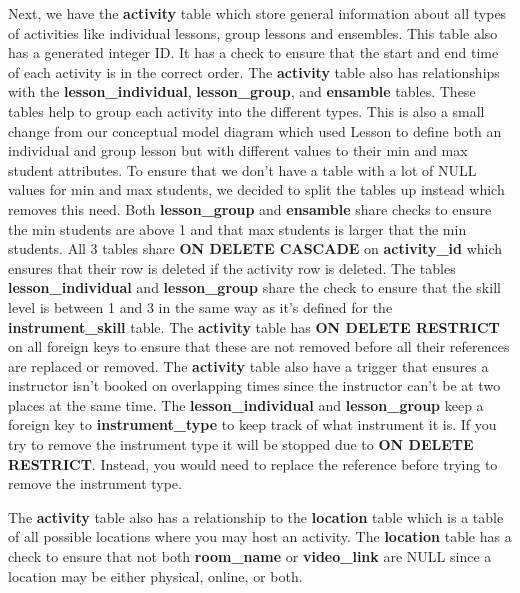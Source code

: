 \documentclass[a4paper]{scrartcl}
\begin{document}
Next, we have the \textbf{activity} table which store general information about all types of activities like individual lessons, group lessons and ensembles. This table also has a generated integer ID. It has a check to ensure that the start and end time of each activity is in the correct order. The \textbf{activity} table also has relationships with the \textbf{lesson\_individual}, \textbf{lesson\_group}, and \textbf{ensamble} tables. These tables help to group each activity into the different types. This is also a small change from our conceptual model diagram which used Lesson to define both an individual and group lesson but with different values to their min and max student attributes. To ensure that we don't have a table with a lot of NULL values for min and max students, we decided to split the tables up instead which removes this need. Both \textbf{lesson\_group} and \textbf{ensamble} share checks to ensure the min students are above 1 and that max students is larger that the min students. All 3 tables share \textbf{ON DELETE CASCADE} on \textbf{activity\_id} which ensures that their row is deleted if the activity row is deleted. The tables \textbf{lesson\_individual} and \textbf{lesson\_group} share the check to ensure that the skill level is between 1 and 3 in the same way as it's defined for the \textbf{instrument\_skill} table. The \textbf{activity} table has \textbf{ON DELETE RESTRICT} on all foreign keys to ensure that these are not removed before all their references are replaced or removed. The \textbf{activity} table also have a trigger that ensures a instructor isn't booked on overlapping times since the instructor can't be at two places at the same time. The \textbf{lesson\_individual} and \textbf{lesson\_group} keep a foreign key to \textbf{instrument\_type} to keep track of what instrument it is. If you try to remove the instrument type it will be stopped due to \textbf{ON DELETE RESTRICT}. Instead, you would need to replace the reference before trying to remove the instrument type.

The \textbf{activity} table also has a relationship to the \textbf{location} table which is a table of all possible locations where you may host an activity. The \textbf{location} table has a check to ensure that not both \textbf{room\_name} or \textbf{video\_link} are NULL since a location may be either physical, online, or both.
\end{document}
